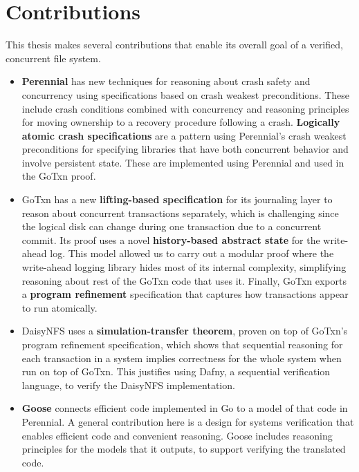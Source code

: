 \section{Contributions}

This thesis makes several contributions that enable its overall goal of a
verified, concurrent file system.

\begin{itemize}
  \item \textbf{Perennial} has new techniques for reasoning about crash safety
        and concurrency using specifications based on crash weakest
        preconditions. These include crash conditions combined with concurrency
        and reasoning principles for moving ownership to a recovery procedure
        following a crash. \textbf{Logically atomic crash specifications} are a
        pattern using Perennial's crash weakest preconditions for specifying
        libraries that have both concurrent behavior and involve persistent
        state. These are implemented using Perennial and used in the GoTxn
        proof.
  \item GoTxn has a new \textbf{lifting-based specification} for its journaling
        layer to reason about concurrent transactions separately, which is
        challenging since the logical disk can change during one transaction due
        to a concurrent commit. Its proof uses a novel \textbf{history-based
        abstract state} for the write-ahead log. This model allowed us to carry
        out a modular proof where the write-ahead logging library hides most of
        its internal complexity, simplifying reasoning about rest of the GoTxn
        code that uses it. Finally, GoTxn exports a \textbf{program refinement}
        specification that captures how transactions appear to run atomically.
  \item DaisyNFS uses a \textbf{simulation-transfer theorem}, proven on top of
        GoTxn's program refinement specification, which shows that sequential
        reasoning for each transaction in a system implies correctness for the
        whole system when run on top of GoTxn. This justifies using Dafny, a
        sequential verification language, to verify the DaisyNFS implementation.
  \item \textbf{Goose} connects efficient code implemented in Go to a model of
        that code in Perennial. A general contribution here is a design for
        systems verification that enables efficient code and convenient
        reasoning. Goose includes reasoning principles for the models that it
        outputs, to support verifying the translated code.
\end{itemize}

